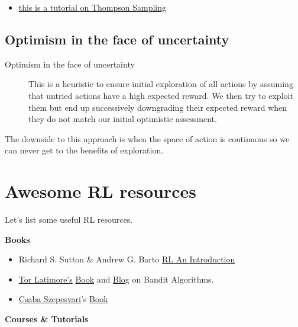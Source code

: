 \documentclass[
  letterpaper,
  DIV=11,
  numbers=noendperiod,
  oneside]{scrartcl}
\providecommand{\tightlist}{%
  \setlength{\itemsep}{0pt}\setlength{\parskip}{0pt}}\usepackage{longtable,booktabs,array}
\theoremstyle{definition}
\theoremstyle{remark}
\begin{document}
\begin{itemize}
\tightlist
\item
  \href{https://web.stanford.edu/~bvr/pubs/TS_Tutorial.pdf}{this is a
  tutorial on Thompson Sampling}
\end{itemize}

\subsection{Optimism in the face of uncertainty}\label{L3G7}

\begin{description}
\item[Optimism in the face of uncertainty]
This is a heuristic to ensure initial exploration of all actions by
assuming that untried actions have a high expected reward. We then try
to exploit them but end up successively downgrading their expected
reward when they do not match our initial optimistic assessment.
\end{description}

The downside to this approach is when the space of action is continuous
so we can never get to the benefits of exploration.

\section{Awesome RL resources}\label{awesome-rl-resources}

Let's list some useful RL resources.

\textbf{Books}

\begin{itemize}
\tightlist
\item
  Richard S. Sutton \& Andrew G. Barto
  \href{http://incompleteideas.net/book/RLbook2020.pdf}{RL An
  Introduction}
\item
  \href{https://tor-lattimore.com/}{Tor Latimore's}
  \href{https://tor-lattimore.com/downloads/book/book.pdf}{Book} and
  \href{https://banditalgs.com/}{Blog} on Bandit Algorithms.
\item
  \href{https://sites.ualberta.ca/~szepesva/}{Csaba Szepesvari}'s
  \href{https://www.ualberta.ca/~szepesva/papers/RLAlgsInMDPs.pdf}{Book}
\end{itemize}

\textbf{Courses \& Tutorials}
\end{document}
